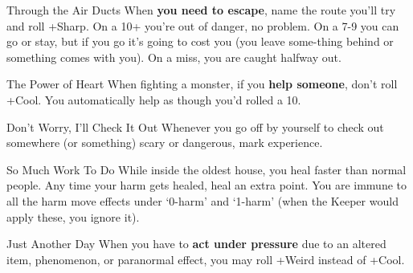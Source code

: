 {\br[1mm]
%
\begin{move}{Through the Air Ducts}
When \textbf{you need to escape}, name the route you’ll try and roll +Sharp. On a 10+ you’re out of danger, no problem. On a 7-9 you can go or stay, but if you go it’s going to cost you (you leave some-thing behind or something comes with you). On a miss, you are caught halfway out.
\end{move}%
\br[1mm]
%
\begin{move}{The Power of Heart}
When fighting a monster, if you \textbf{help someone}, don’t roll +Cool. You automatically help as though you’d rolled a 10.
\end{move}%
\br[1mm]
%
\begin{move}{Don't Worry, I'll Check It Out}
Whenever you go off by yourself to check out somewhere (or something) scary or dangerous, mark experience.
\end{move}%
\br[1mm]
%
\begin{move}{So Much Work To Do}
While inside the oldest house, you heal faster than normal people. Any time your harm gets healed, heal an extra point. You are immune to all the harm move effects under ‘0-harm’ and ‘1-harm’ (when the Keeper would apply these, you ignore it).
\end{move}%
\br[1mm]
%
\begin{move}{Just Another Day}
When you have to \textbf{act under pressure} due to an altered item, phenomenon, or paranormal effect, you may roll +Weird instead of +Cool.
\end{move}%
\br[1mm]
%
}\pagebreak%
%
